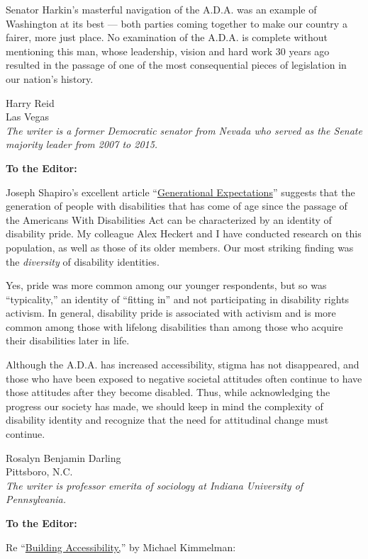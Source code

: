 Senator Harkin's masterful navigation of the A.D.A. was an example of
Washington at its best --- both parties coming together to make our
country a fairer, more just place. No examination of the A.D.A. is
complete without mentioning this man, whose leadership, vision and hard
work 30 years ago resulted in the passage of one of the most
consequential pieces of legislation in our nation's history.

Harry Reid\\
Las Vegas\\
\emph{The writer is a former Democratic senator from Nevada who served
as the Senate majority leader from 2007 to 2015.}

\textbf{To the Editor:}

Joseph Shapiro's excellent article
``\href{https://www.nytimes.com/2020/07/17/style/americans-with-disabilities-act.html}{Generational
Expectations}'' suggests that the generation of people with disabilities
that has come of age since the passage of the Americans With
Disabilities Act can be characterized by an identity of disability
pride. My colleague Alex Heckert and I have conducted research on this
population, as well as those of its older members. Our most striking
finding was the \emph{diversity} of disability identities.

Yes, pride was more common among our younger respondents, but so was
``typicality,'' an identity of ``fitting in'' and not participating in
disability rights activism. In general, disability pride is associated
with activism and is more common among those with lifelong disabilities
than among those who acquire their disabilities later in life.

Although the A.D.A. has increased accessibility, stigma has not
disappeared, and those who have been exposed to negative societal
attitudes often continue to have those attitudes after they become
disabled. Thus, while acknowledging the progress our society has made,
we should keep in mind the complexity of disability identity and
recognize that the need for attitudinal change must continue.

Rosalyn Benjamin Darling\\
Pittsboro, N.C.\\
\emph{The writer is professor emerita of sociology at Indiana University
of Pennsylvania.}

\textbf{To the Editor:}

Re
``\href{https://www.nytimes.com/2020/07/20/arts/disabilities-architecture-design.html}{Building
Accessibility,}'' by Michael Kimmelman:

